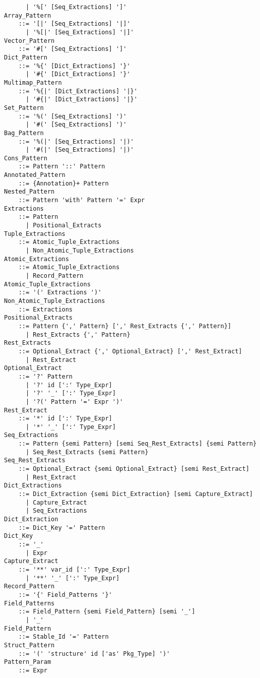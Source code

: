 \begin{lstlisting}
      | '%[' [Seq_Extractions] ']'
Array_Pattern
    ::= '[|' [Seq_Extractions] '|]'
      | '%[|' [Seq_Extractions] '|]'
Vector_Pattern
    ::= '#[' [Seq_Extractions] ']'
Dict_Pattern 
    ::= '%{' [Dict_Extractions] '}'
      | '#{' [Dict_Extractions] '}'
Multimap_Pattern 
    ::= '%{|' [Dict_Extractions] '|}'
      | '#{|' [Dict_Extractions] '|}'
Set_Pattern
    ::= '%(' [Seq_Extractions] ')'
      | '#(' [Seq_Extractions] ')'
Bag_Pattern
    ::= '%(|' [Seq_Extractions] '|)'
      | '#(|' [Seq_Extractions] '|)'
Cons_Pattern 
    ::= Pattern '::' Pattern
Annotated_Pattern 
    ::= {Annotation}+ Pattern
Nested_Pattern
    ::= Pattern 'with' Pattern '=' Expr
Extractions
    ::= Pattern 
      | Positional_Extracts
Tuple_Extractions 
    ::= Atomic_Tuple_Extractions
      | Non_Atomic_Tuple_Extractions
Atomic_Extractions
    ::= Atomic_Tuple_Extractions
      | Record_Pattern
Atomic_Tuple_Extractions 
    ::= '(' Extractions ')'
Non_Atomic_Tuple_Extractions 
    ::= Extractions
Positional_Extracts 
    ::= Pattern {',' Pattern} [',' Rest_Extracts {',' Pattern}]
      | Rest_Extracts {',' Pattern}
Rest_Extracts
    ::= Optional_Extract {',' Optional_Extract} [',' Rest_Extract]
      | Rest_Extract
Optional_Extract 
    ::= '?' Pattern
      | '?' id [':' Type_Expr]
      | '?' '_' [':' Type_Expr]
      | '?(' Pattern '=' Expr ')'
Rest_Extract 
    ::= '*' id [':' Type_Expr]
      | '*' '_' [':' Type_Expr]
Seq_Extractions
    ::= Pattern {semi Pattern} [semi Seq_Rest_Extracts] {semi Pattern}
      | Seq_Rest_Extracts {semi Pattern}
Seq_Rest_Extracts 
    ::= Optional_Extract {semi Optional_Extract} [semi Rest_Extract]
      | Rest_Extract
Dict_Extractions 
    ::= Dict_Extraction {semi Dict_Extraction} [semi Capture_Extract]
      | Capture_Extract
      | Seq_Extractions
Dict_Extraction
    ::= Dict_Key '=' Pattern
Dict_Key 
    ::= '_'
      | Expr
Capture_Extract 
    ::= '**' var_id [':' Type_Expr]
      | '**' '_' [':' Type_Expr]
Record_Pattern 
    ::= '{' Field_Patterns '}'
Field_Patterns 
    ::= Field_Pattern {semi Field_Pattern} [semi '_']
      | '_'
Field_Pattern 
    ::= Stable_Id '=' Pattern
Struct_Pattern
    ::= '(' 'structure' id ['as' Pkg_Type] ')'
Pattern_Param 
    ::= Expr
\end{lstlisting}

